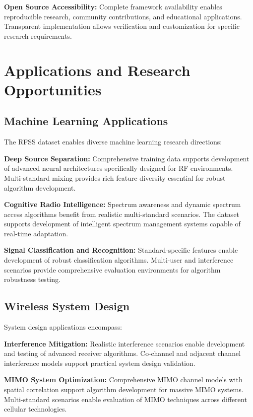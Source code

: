 \documentclass[twocolumn]{article}
\begin{document}
\textbf{Open Source Accessibility:} Complete framework availability enables reproducible research, community contributions, and educational applications. Transparent implementation allows verification and customization for specific research requirements.

\section{Applications and Research Opportunities}

\subsection{Machine Learning Applications}

The RFSS dataset enables diverse machine learning research directions:

\textbf{Deep Source Separation:} Comprehensive training data supports development of advanced neural architectures specifically designed for RF environments. Multi-standard mixing provides rich feature diversity essential for robust algorithm development.

\textbf{Cognitive Radio Intelligence:} Spectrum awareness and dynamic spectrum access algorithms benefit from realistic multi-standard scenarios. The dataset supports development of intelligent spectrum management systems capable of real-time adaptation.

\textbf{Signal Classification and Recognition:} Standard-specific features enable development of robust classification algorithms. Multi-user and interference scenarios provide comprehensive evaluation environments for algorithm robustness testing.

\subsection{Wireless System Design}

System design applications encompass:

\textbf{Interference Mitigation:} Realistic interference scenarios enable development and testing of advanced receiver algorithms. Co-channel and adjacent channel interference models support practical system design validation.

\textbf{MIMO System Optimization:} Comprehensive MIMO channel models with spatial correlation support algorithm development for massive MIMO systems. Multi-standard scenarios enable evaluation of MIMO techniques across different cellular technologies.
\end{document}
